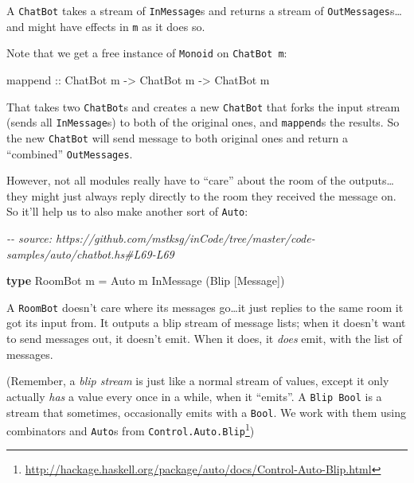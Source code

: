 \documentclass[]{article}
\newenvironment{Shaded}{}{}
\newcommand{\CommentTok}[1]{\textcolor[rgb]{0.38,0.63,0.69}{\textit{#1}}}
\newcommand{\DataTypeTok}[1]{\textcolor[rgb]{0.56,0.13,0.00}{#1}}
\newcommand{\FunctionTok}[1]{\textcolor[rgb]{0.02,0.16,0.49}{#1}}
\newcommand{\KeywordTok}[1]{\textcolor[rgb]{0.00,0.44,0.13}{\textbf{#1}}}
\newcommand{\NormalTok}[1]{#1}
\newcommand{\OtherTok}[1]{\textcolor[rgb]{0.00,0.44,0.13}{#1}}
\renewcommand{\href}[2]{#2\footnote{\url{#1}}}
\begin{document}
A \texttt{ChatBot} takes a stream of \texttt{InMessage}s and returns a stream of
\texttt{OutMessages}s\ldots and might have effects in \texttt{m} as it does so.

Note that we get a free instance of \texttt{Monoid} on \texttt{ChatBot\ m}:

\begin{Shaded}
\begin{Highlighting}[]
\FunctionTok{mappend}\OtherTok{ ::} \DataTypeTok{ChatBot}\NormalTok{ m }\OtherTok{{-}>} \DataTypeTok{ChatBot}\NormalTok{ m }\OtherTok{{-}>} \DataTypeTok{ChatBot}\NormalTok{ m}
\end{Highlighting}
\end{Shaded}

That takes two \texttt{ChatBot}s and creates a new \texttt{ChatBot} that forks
the input stream (sends all \texttt{InMessage}s) to both of the original ones,
and \texttt{mappend}s the results. So the new \texttt{ChatBot} will send message
to both original ones and return a ``combined'' \texttt{OutMessages}.

However, not all modules really have to ``care'' about the room of the
outputs\ldots they might just always reply directly to the room they received
the message on. So it'll help us to also make another sort of \texttt{Auto}:

\begin{Shaded}
\begin{Highlighting}[]
\CommentTok{{-}{-} source: https://github.com/mstksg/inCode/tree/master/code{-}samples/auto/chatbot.hs\#L69{-}L69}

\KeywordTok{type} \DataTypeTok{RoomBot}\NormalTok{ m }\OtherTok{=} \DataTypeTok{Auto}\NormalTok{ m }\DataTypeTok{InMessage}\NormalTok{ (}\DataTypeTok{Blip}\NormalTok{ [}\DataTypeTok{Message}\NormalTok{])}
\end{Highlighting}
\end{Shaded}

A \texttt{RoomBot} doesn't care where its messages go\ldots it just replies to
the same room it got its input from. It outputs a blip stream of message lists;
when it doesn't want to send messages out, it doesn't emit. When it does, it
\emph{does} emit, with the list of messages.

(Remember, a \emph{blip stream} is just like a normal stream of values, except
it only actually \emph{has} a value every once in a while, when it ``emits''. A
\texttt{Blip\ Bool} is a stream that sometimes, occasionally emits with a
\texttt{Bool}. We work with them using combinators and \texttt{Auto}s from
\href{http://hackage.haskell.org/package/auto/docs/Control-Auto-Blip.html}{\texttt{Control.Auto.Blip}})
\end{document}
